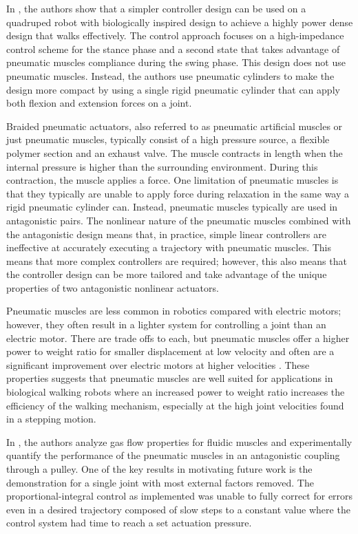 In \cite{Wait2014}, the authors show that a simpler controller design can be
used on a quadruped robot with biologically inspired design to achieve a highly
power dense design that walks effectively. The control approach focuses on
a high-impedance control scheme for the stance phase and a second state
that takes advantage of pneumatic muscles compliance during the swing phase.
This design does not use pneumatic muscles. Instead, the authors use pneumatic
cylinders to make the design more compact by using a single rigid pneumatic cylinder that can apply both
flexion and extension forces on a joint. 


Braided pneumatic actuators, also referred to as pneumatic artificial muscles or just pneumatic muscles, typically consist of a high pressure source, a
flexible polymer section and an exhaust valve. The muscle contracts in length
when the internal pressure is higher than the surrounding environment. During
this contraction, the muscle applies a force. One limitation of pneumatic
muscles is that they typically are unable to apply force during relaxation in
the same way a rigid pneumatic cylinder can. Instead, pneumatic muscles typically are used in
antagonistic pairs. The nonlinear nature of the pneumatic muscles combined with the
antagonistic design means that, in practice, simple linear controllers are
ineffective at accurately executing a trajectory with pneumatic muscles. This means that more complex controllers are required; however,
this also means that the controller design can be more tailored and take
advantage of the unique properties of two antagonistic nonlinear actuators.

Pneumatic muscles are less common in robotics compared with electric motors;
however,
they often result in a lighter system for controlling a joint than an
electric motor. There are trade offs to each, but pneumatic muscles offer a
higher power to weight ratio for smaller displacement at low velocity and
often are a significant improvement over electric motors at higher velocities \cite{Tavakoli2008}. These properties suggests that pneumatic muscles are well suited for applications in
biological walking robots where an increased power to weight ratio increases
the efficiency of the walking mechanism, especially at the high joint velocities
found in a stepping motion.


In \cite{Situm2008}, the authors analyze gas flow properties for fluidic muscles
and experimentally quantify the performance of the pneumatic muscles in an antagonistic coupling
through a pulley. One of the key results in \cite{Situm2008} motivating future work is the
demonstration for a single joint with most external factors removed. The
proportional-integral control as implemented was unable to fully correct for
errors even in a desired trajectory composed of slow steps to a constant value
where the control system had time to reach a set actuation pressure.


